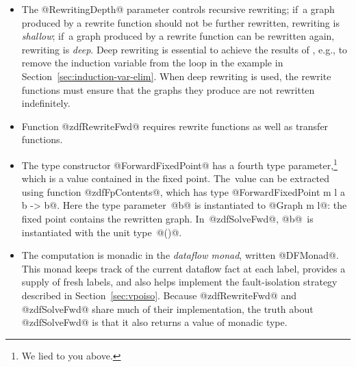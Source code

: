 \documentclass[blockstyle,preprint,natbib,nocopyrightspace]{sigplanconf}
\newcommand{\authornote}[1]{{\em #1}}
\def\authornote#1{\unskip\relax}
\newcommand{\simon}[1]{\authornote{SLPJ: #1}}
\newcommand\secref[1]{Section~\ref{sec:#1}}
\newcommand\seclabel[1]{\label{sec:#1}}
\begin{document}
\begin{itemize}
\item
The @RewritingDepth@ parameter controls recursive rewriting;
if~a graph produced by a rewrite function should not be further rewritten,
rewriting is \emph{shallow};
if~a graph produced by a rewrite function can be rewritten again,
rewriting is \emph{deep}.
Deep rewriting is essential to achieve the results of
\citet{lerner-grove-chambers:2002}, e.g., to remove the induction
variable from the loop in the example in \secref{induction-var-elim}.
When deep rewriting is used, the rewrite functions must
ensure that the graphs they produce are not rewritten indefinitely.
\item
Function @zdfRewriteFwd@ requires rewrite functions as well as transfer
functions.
\item
The type constructor @ForwardFixedPoint@ has a fourth
type parameter,\footnote
{We lied to you above.}
which is a value contained in the fixed point.
The~value can be extracted using function @zdfFpContents@, which has
type @ForwardFixedPoint m l a b -> b@.
Here the type parameter~@b@ is instantiated to @Graph m l@: the fixed point
contains the rewritten graph.
In~@zdfSolveFwd@, @b@~is instantiated with
the unit type~@()@.
\simon{We can't make this point until later, where we say that solve is
implemented using rewrite.  NR: I don't understand why we can't make
this point now---we are revealing that @ForwardFixedPoint@ has an
additional type parameter, and we say what value it takes on in the
earlier example.} 
\item
The computation is monadic in the \emph{dataflow monad}, written
@DFMonad@.
This monad keeps track of the current dataflow fact at each label,
provides a supply of fresh labels, 
and
also helps implement the fault-isolation strategy described
in \secref{vpoiso}.
Because @zdfRewriteFwd@ and @zdfSolveFwd@ share much of their
implementation, the truth 
about @zdfSolveFwd@ is that it also returns a value of monadic type.
\simon{We should postpone this too.  And in any case we don't need to
expose it to the client, if it is a mere implementation matter, do we?
NR: It matters very much to the client, because it is exposed---the
actual types are \emph{not} as claimed earlier in the paper.}
\end{itemize}


\seclabel{dfengine-spec}
\end{document}
